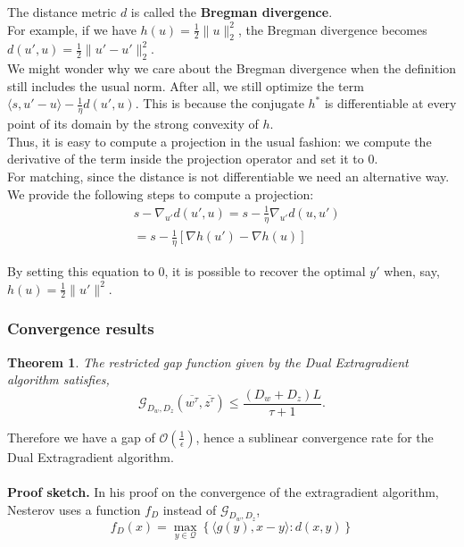 \documentclass{article}
\newtheorem{theorem}{Theorem}
\begin{document}
The distance metric $d$ is called the \textbf{Bregman divergence}.\\ For example, if we have $h( u) = \frac{1}{2} \lVert  u \rVert_2^2 $, the Bregman divergence becomes $d( u',  u) = \frac{1}{2} \lVert  u' -  u' \rVert_2^2$.\\
We might wonder why we care about the Bregman divergence when the definition still includes the usual norm. After all, we still optimize the term $\langle  s,  u' -  u \rangle - \frac{1}{\eta} d( u',   u)$. This is because the conjugate $h^{*}$ is differentiable at every point of its domain by the strong convexity of $h$.\\
Thus, it is easy to compute a projection in the usual fashion: we compute the derivative of the term inside the projection operator and set it to 0.\\
For matching, since the distance is not differentiable we need an alternative way. We provide the following steps to compute a projection: 
\begin{equation}
\begin{aligned}
  & s - \nabla_{ u'} d( u',  u) =  s - \frac{1}{\eta} \nabla_{ u'} d( u,  u')\\
  &=  s - \frac{1}{\eta} \left [\nabla h( u') - \nabla h( u) \right]
\end{aligned}
\end{equation}

By setting this equation to 0, it is possible to recover the optimal $ y'$ when, say, \quad $h( u) = \frac{1}{2} \lVert  u' \rVert^2$. 

\subsubsection{Convergence results} 
\begin{theorem} \cite{Taskaretal06}
The restricted gap function given by the Dual Extragradient algorithm satisfies,
\begin{equation} \mathcal{G}_{D_{ w}, D_{ z}}(\overline{ w^{\tau}},
\overline{ z^{\tau}}) \leq \frac{\left( D_{ w} + D_{ z} \right)
L}{\tau + 1}.
\label{eq:ub}
\end{equation}
\end{theorem}
Therefore we have a gap of $\mathcal{O}(\frac{1}{\epsilon})$, hence a sublinear convergence rate for the Dual Extragradient algorithm.\\
\\
\textbf{Proof sketch.} In his proof on the convergence of the extragradient algorithm, Nesterov uses a
function $f_D$ instead of $\mathcal{G}_{D_{ w}, D_{ z}}$, 
\begin{equation}
f_D( x) = \max_{ y \in \mathcal{Q}} \left \{ \langle g( y),  x -
 y \rangle : d( x,  y) \right \}
\end{equation}
\end{document}
